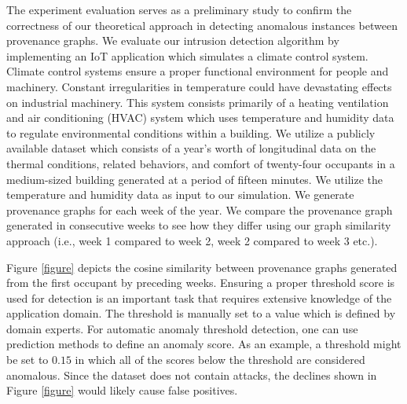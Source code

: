 The experiment evaluation serves as a preliminary study to confirm the correctness of our theoretical approach in detecting anomalous instances between provenance graphs. We evaluate our intrusion detection algorithm by implementing an IoT application which simulates a climate control system. Climate control systems ensure a proper functional environment for people and machinery. Constant irregularities in temperature could have devastating effects on industrial machinery. This system consists primarily of a heating ventilation and air conditioning (HVAC) system which uses temperature and humidity data to regulate environmental conditions within a building. We utilize a publicly available dataset \cite{LANGEVIN201594} which consists of a year's worth of longitudinal data on the thermal conditions, related behaviors, and comfort of twenty-four occupants in a medium-sized building generated at  a period of fifteen minutes. We utilize the temperature and humidity data as input to our simulation. We generate provenance graphs for each week of the year. We compare the provenance graph generated in consecutive weeks to see how they differ using our graph similarity approach (i.e., week 1 compared to week 2, week 2 compared to week 3 etc.). 
\par Figure \ref{figure} depicts the cosine similarity between provenance graphs generated from the first occupant by preceding weeks. Ensuring a proper threshold score is used for detection is an important task that requires extensive knowledge of the application domain. The threshold is manually set to a value which is defined by domain experts. For automatic anomaly threshold detection, one can use prediction methods to define an anomaly score. As an example, a threshold might be set to $0.15$ in which all of the scores below the threshold are considered anomalous. Since the dataset does not contain attacks, the declines shown in Figure \ref{figure} would likely cause false positives.
 




